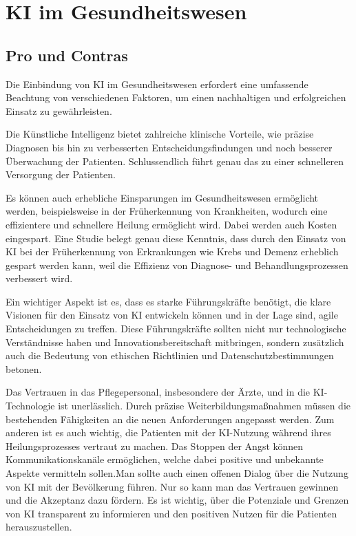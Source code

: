 \chapter{KI im Gesundheitswesen}

\section {Pro und Contras}
Die Einbindung von KI im Gesundheitswesen erfordert eine umfassende Beachtung von verschiedenen Faktoren, um einen nachhaltigen und erfolgreichen Einsatz zu gewährleisten.

\vspace{1mm}Die Künstliche Intelligenz bietet zahlreiche klinische Vorteile, wie präzise Diagnosen bis hin zu verbesserten Entscheidungsfindungen und noch besserer Überwachung der Patienten. Schlussendlich führt genau das zu einer schnelleren Versorgung der Patienten.

\vspace{1mm}Es können auch erhebliche Einsparungen im Gesundheitswesen ermöglicht werden, beispielsweise in der Früherkennung von Krankheiten, wodurch eine effizientere und schnellere Heilung ermöglicht wird. Dabei werden auch Kosten eingespart. Eine Studie belegt genau diese Kenntnis, dass durch den Einsatz von KI bei der Früherkennung von Erkrankungen wie Krebs und Demenz erheblich gespart werden kann, weil die Effizienz von Diagnose- und Behandlungsprozessen verbessert wird.

\vspace{6mm}Ein wichtiger Aspekt ist es, dass es starke Führungskräfte benötigt, die klare Visionen für den Einsatz von KI entwickeln können und in der Lage sind, agile Entscheidungen zu treffen. Diese Führungskräfte sollten nicht nur technologische Verständnisse haben und Innovationsbereitschaft mitbringen, sondern zusätzlich auch die Bedeutung von ethischen Richtlinien und Datenschutzbestimmungen betonen.

\vspace{1mm}Das Vertrauen in das Pflegepersonal, insbesondere der Ärzte, und in die KI-Technologie ist unerlässlich. Durch präzise Weiterbildungsmaßnahmen müssen die bestehenden Fähigkeiten an die neuen Anforderungen angepasst werden. Zum anderen ist es auch wichtig, die Patienten mit der KI-Nutzung während ihres Heilungsprozesses vertraut zu machen. Das Stoppen der Angst können Kommunikationskanäle ermöglichen, welche dabei positive und unbekannte Aspekte vermitteln sollen.Man sollte auch einen offenen Dialog über die Nutzung von KI mit der Bevölkerung führen. Nur so kann man das Vertrauen gewinnen und die Akzeptanz dazu fördern. Es ist wichtig, über die Potenziale und Grenzen von KI transparent zu informieren und den positiven Nutzen für die Patienten herauszustellen.

